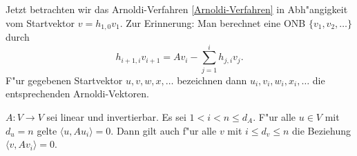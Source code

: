 Jetzt betrachten wir das Arnoldi-Verfahren \ref{Arnoldi-Verfahren} in
Abh"angigkeit vom Startvektor $v = h_{1,0}v_1 $. Zur Erinnerung: Man berechnet
eine ONB $\{v_1,v_2,\ldots\}$ durch
\begin{equation} \label{Arnoldi_rek.eq}
h_{i+1,i} v_{i+1} = Av_i - \sum_{j=1}^{i} h_{j,i}v_j.
\end{equation}
F"ur gegebenen Startvektor $u,v,w,x,\ldots$ bezeichnen dann $u_i,v_i,w_i,x_i, \ldots$
die entsprechenden Arnoldi-Vektoren. 

\begin{lem} \label{FMproof2:lem}
$A: V \to V$ sei linear und invertierbar. Es sei $1 < i  < n \leq d_A$.
F"ur alle $u \in V$ mit $d_u = n$ gelte $\langle u, Au_i \rangle =0$. Dann gilt
auch f"ur alle $v$ mit $i \leq d_v \leq n$ die Beziehung $\langle v, Av_i \rangle = 0$.
\end{lem}
